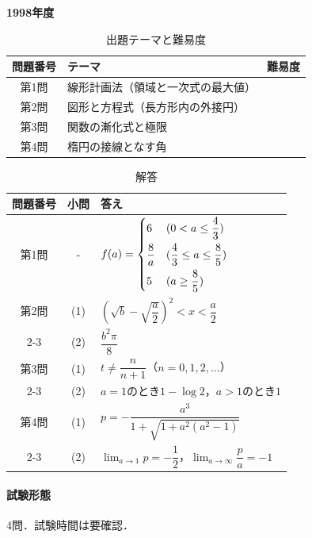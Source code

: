 \documentclass[../../main.tex]{subfiles}
\begin{document}
\begin{center}
  {\fontsize{48pt}{58pt}\selectfont \textbf{1998}\normalsize\textbf{年度}}
\end{center}

\begin{table}[htb]
  \centering
  \caption{出題テーマと難易度}
  \begin{tabular}{|c|p{9cm}|c|}
    \hline
    \textbf{問題番号} & \textbf{テーマ} & \textbf{難易度} \\
    \hline
    第1問 & 線形計画法（領域と一次式の最大値） & \\
    \hline
    第2問 & 図形と方程式（長方形内の外接円） & \\
    \hline
    第3問 & 関数の漸化式と極限 & \\
    \hline
    第4問 & 楕円の接線となす角 & \\
    \hline
  \end{tabular}
\end{table}

\begin{table}[htb]
  \centering
  \caption{解答}
  \renewcommand{\arraystretch}{1.4}
  \begin{tabular}{|c|c|p{9cm}|}
    \hline
    \textbf{問題番号} & \textbf{小問} & \textbf{答え} \\
    \hline
    第1問 & - & $f(a)=
    \begin{dcases}6&(0<a\le\dfrac{4}{3})\\ \dfrac{8}{a}&(\dfrac{4}{3}\le a\le\dfrac{8}{5})\\ 5&(a\ge\dfrac{8}{5})
    \end{dcases}$ \\
    \hline
    第2問 & (1) & $\left(\sqrt{b}-\sqrt{\dfrac{a}{2}}\right)^2<x<\dfrac{a}{2}$ \\
    \cline{2-3}
    & (2) & $\dfrac{b^2\pi}{8}$ \\
    \hline
    第3問 & (1) & $t\ne\dfrac{n}{n+1}$（$n=0,1,2,\ldots$） \\
    \cline{2-3}
    & (2) & $a=1$のとき$1-\log 2$，$a>1$のとき$1$ \\
    \hline
    第4問 & (1) & $p=-\dfrac{a^3}{1+\sqrt{1+a^2(a^2-1)}}$ \\
    \cline{2-3}
    & (2) & $\displaystyle\lim_{a\to1}p=-\dfrac{1}{2}$，$\displaystyle\lim_{a\to\infty}\dfrac{p}{a}=-1$ \\
    \hline
  \end{tabular}
\end{table}

\paragraph{試験形態}
4問．試験時間は要確認．
\end{document}
